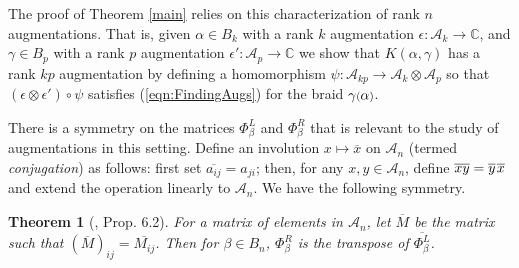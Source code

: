 \documentclass[11pt]{amsart}
\def\C{{\mathbb C}}
\def\A{{\mathcal A}}
\def\cl{\mathcal}
\newcommand*{\smallp}[1]{\scalebox{.75}{\ensuremath#1}}
\newtheorem{thm}{Theorem}[section]
\theoremstyle{definition}
\begin{document}
  The proof of Theorem \ref{main} relies on this characterization of rank $n$ augmentations. That is, given $\alpha\in B_k$ with a rank $k$ augmentation $\epsilon:\cl A_k\to\C$, and $\gamma\in B_p$ with a rank $p$ augmentation $\epsilon':\cl A_p\to\C$ we show that $K(\alpha,\gamma)$ has a rank $kp$ augmentation by defining a homomorphism $\psi:\cl A_{kp}\to\cl A_k\otimes\cl A_p$ so that $(\epsilon\otimes\epsilon')\circ\psi$ satisfies (\ref{eqn:FindingAugs}) for the braid $\gamma\smallp(\alpha\smallp)$.

  There is a symmetry on the matrices $\Phi_\beta^L$ and $\Phi_\beta^R$ that is relevant to the study of augmentations in this setting. Define an involution $x\mapsto\overline x$ on $\A_n$ (termed \emph{conjugation}) as follows: first set $\overline{a_{ij}}=a_{ji}$; then, for any $x,y\in\A_n$, define $\overline{xy}=\overline y\hspace*{1pt}\overline x$ and extend the operation linearly to $\A_n$. We have the following symmetry.

  \begin{thm}[\cite{Ng05}, Prop.\hspace*{-0.7pt} 6.2]For a matrix of elements in $\A_n$, let $\overline{M}$ be the matrix such that $\left(\overline M\right)_{ij} = \overline{M_{ij}}$. Then for $\beta\in B_n$, $\Phi_\beta^R$ is the transpose of $\overline{\Phi_\beta^L}$.
  \label{thm:Transpose}
  \end{thm}


\end{document}
